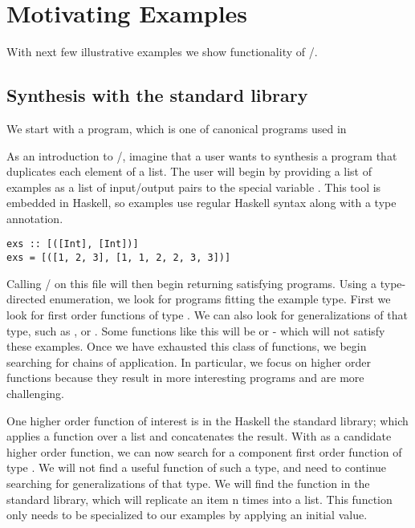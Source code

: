 \section{Motivating Examples} 
\label{examples}

With next few illustrative examples we show functionality of \ourTool/.

\subsection{Synthesis with the standard library}

We start with a  program, which is one of canonical 
programs used in 

As an introduction to \ourTool/, imagine that a user wants to synthesis a  program that duplicates each element of a list. 
The user will begin by providing a list of examples as a list of input/output pairs to the special variable .
This tool is embedded in Haskell, so examples use regular Haskell syntax along with a type annotation.

\begin{lstlisting}
exs :: [([Int], [Int])]
exs = [([1, 2, 3], [1, 1, 2, 2, 3, 3])]
\end{lstlisting}

Calling \ourTool/ on this file will then begin returning satisfying programs.
Using a type-directed enumeration, we look for programs fitting the example type.
First we look for first order functions of type \codeinline{[Int]->[Int]}.
We can also look for generalizations of that type, such as \codeinline{[a]->[a]}, or .
Some functions like this will be  or  - which will not satisfy these examples.
Once we have exhausted this class of functions, we begin searching for chains of application.
In particular, we focus on higher order functions because they result in more interesting programs and are more challenging.

One higher order function of interest is in the Haskell the standard library;  which applies a function over a list and concatenates the result.
With  as a candidate higher order function, we can now search for a component first order function of type .
We will not find a useful function of such a type, and need to continue searching for generalizations of that type.
We will find the function  in the standard library, which will replicate an item n times into a list.
This function only needs to be specialized to our examples by applying an initial value.

